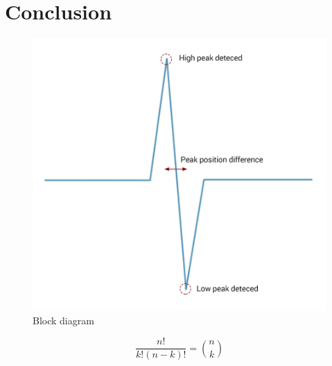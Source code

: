 \graphicspath{{Chapters/Project/}}

\section{Conclusion} %
\label{sec:conclusion}


\begin{figure}[H]
\centering
\includegraphics[width = 200 pt]{Img/Figures.png}
\caption{Block diagram}
\label{fig:BlockDiagram}
\end{figure}

\begin{equation}
\frac{n!}{k!(n-k)!} = \binom{n}{k}
\label{eq: myequation}
\end{equation}